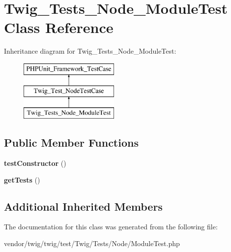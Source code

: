 \hypertarget{classTwig__Tests__Node__ModuleTest}{}\section{Twig\+\_\+\+Tests\+\_\+\+Node\+\_\+\+Module\+Test Class Reference}
\label{classTwig__Tests__Node__ModuleTest}
Inheritance diagram for Twig\+\_\+\+Tests\+\_\+\+Node\+\_\+\+Module\+Test\+:\begin{figure}[H]
\begin{center}
\leavevmode
\includegraphics[height=3.000000cm]{classTwig__Tests__Node__ModuleTest}
\end{center}
\end{figure}
\subsection*{Public Member Functions}
\begin{DoxyCompactItemize}
\item 
{\bfseries test\+Constructor} ()\hypertarget{classTwig__Tests__Node__ModuleTest_a3bf1ce9c228551de1d1c12b615a33731}{}\label{classTwig__Tests__Node__ModuleTest_a3bf1ce9c228551de1d1c12b615a33731}

\item 
{\bfseries get\+Tests} ()\hypertarget{classTwig__Tests__Node__ModuleTest_a30b65b9efb416c78764100cbfc7177bd}{}\label{classTwig__Tests__Node__ModuleTest_a30b65b9efb416c78764100cbfc7177bd}

\end{DoxyCompactItemize}
\subsection*{Additional Inherited Members}


The documentation for this class was generated from the following file\+:\begin{DoxyCompactItemize}
\item 
vendor/twig/twig/test/\+Twig/\+Tests/\+Node/Module\+Test.\+php\end{DoxyCompactItemize}
